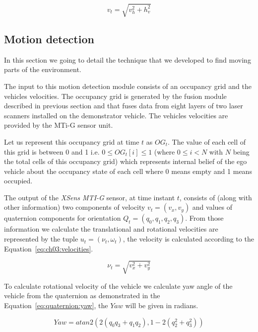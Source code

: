 \begin{equation}
\label{eq:velocity}
v_t=\sqrt{v_h^2+h_v^2}
\end{equation}

\subsection{Motion detection}
\label{ch03:motiondetection}

In this section we going to detail the technique that we developed to find moving parts of the environment. 

The input to this motion detection module consists of an occupancy grid and the vehicles velocities. The occupancy grid is generated by the fusion module described in previous section and that fuses data from eight layers of two laser scanners installed on the demonstrator vehicle. The vehicles velocities are provided by the MTi-G sensor unit.

Let us represent this occupancy grid at time $t$ as  $OG_t$. The value of each cell of this grid is between 0 and 1 i.e. $0 \leq OG_t[i] \leq 1$ (where $0 \leq i<N$ with $N$ being the total cells of this occupancy grid) which represents internal belief of the ego vehicle about the occupancy state of each cell where 0 means empty and 1 means occupied.


The output of the \textit{XSens MTI-G} sensor, at time instant $t$,
consists of (along with other information) two components of velocity $v_t=(v_x, v_y)$ and values of
quaternion components for orientation $Q_t=(q_0, q_1, q_2, q_3)$. From those information we calculate the
translational and rotational velocities are represented by the tuple $u_t=(\nu_t, \omega_t)$, the velocity is calculated according to the Equation~\ref{eq:ch03:velocities}.

\begin{equation}
\label{eq:ch03:velocities}
\nu_t = \sqrt{v_x^2+v_y^2}
\end{equation}

To calculate rotational velocity of the vehicle we calculate yaw angle of the vehicle from the quaternion
as demonstrated in the Equation~\ref{eq:quaternion:yaw}, the $Yaw$ will be given in radians.

\begin{equation}
Yaw = atan2(2(q_0 q_3+q_1 q_2),1-2(q_2^2+q_3^2))
\label{eq:quaternion:yaw}
\end{equation}

